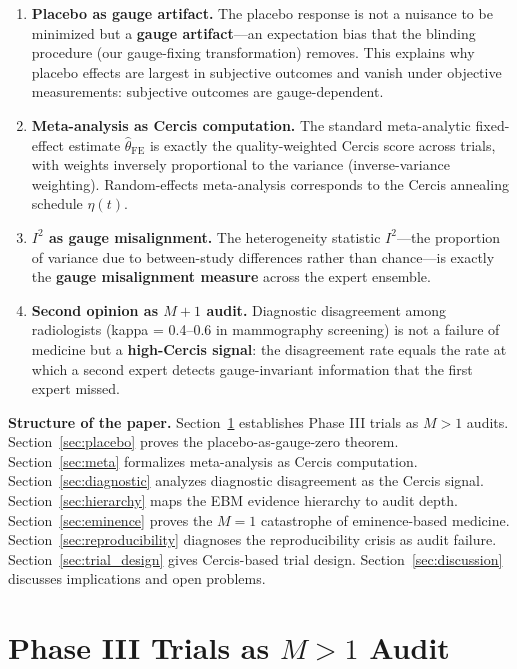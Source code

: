 \documentclass[12pt,a4paper]{article}
\theoremstyle{remark}
\newcommand{\Cercis}{\textsf{Cercis}}
\begin{document}
\begin{enumerate}[leftmargin=*, label=(\arabic*)]
  \item \textbf{Placebo as gauge artifact.} The placebo response is not a
  nuisance to be minimized but a \textbf{gauge artifact}---an expectation
  bias that the blinding procedure (our gauge-fixing transformation)
  removes. This explains why placebo effects are largest in subjective
  outcomes and vanish under objective measurements: subjective outcomes
  are gauge-dependent.
  \item \textbf{Meta-analysis as Cercis computation.} The standard
  meta-analytic fixed-effect estimate $\hat{\theta}_{\text{FE}}$ is exactly
  the quality-weighted Cercis score across trials, with weights inversely
  proportional to the variance (inverse-variance weighting). Random-effects
  meta-analysis corresponds to the \Cercis{} annealing schedule $\eta(t)$.
  \item \textbf{$I^2$ as gauge misalignment.} The heterogeneity statistic
  $I^2$---the proportion of variance due to between-study differences rather
  than chance---is exactly the \textbf{gauge misalignment measure} across
  the expert ensemble.
  \item \textbf{Second opinion as $M+1$ audit.} Diagnostic disagreement
  among radiologists (kappa = 0.4--0.6 in mammography screening) is not
  a failure of medicine but a \textbf{high-Cercis signal}: the disagreement
  rate equals the rate at which a second expert detects gauge-invariant
  information that the first expert missed.
\end{enumerate}

\medskip
\noindent\textbf{Structure of the paper.}
Section~\ref{sec:phase3} establishes Phase III trials as $M>1$ audits.
Section~\ref{sec:placebo} proves the placebo-as-gauge-zero theorem.
Section~\ref{sec:meta} formalizes meta-analysis as \Cercis{} computation.
Section~\ref{sec:diagnostic} analyzes diagnostic disagreement as the
\Cercis{} signal. Section~\ref{sec:hierarchy} maps the EBM evidence
hierarchy to audit depth. Section~\ref{sec:eminence} proves the
$M=1$ catastrophe of eminence-based medicine.
Section~\ref{sec:reproducibility} diagnoses the reproducibility crisis as
audit failure. Section~\ref{sec:trial_design} gives Cercis-based trial
design. Section~\ref{sec:discussion} discusses implications and open
problems.


\section{Phase III Trials as $M>1$ Audit}
\label{sec:phase3}
\end{document}
